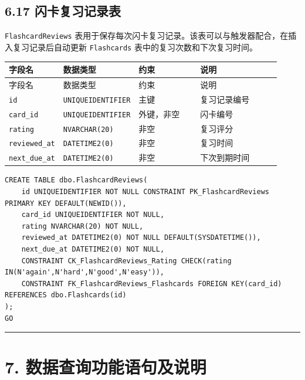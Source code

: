 \documentclass[10pt,a4paper,fontset=none]{ctexart}
\begin{document}
\subsection*{6.17 闪卡复习记录表}

\texttt{FlashcardReviews} 表用于保存每次闪卡复习记录。该表可以与触发器配合，在插入复习记录后自动更新 \texttt{Flashcards} 表中的复习次数和下次复习时间。\par

\begingroup\scriptsize
\renewcommand{\arraystretch}{1.18}
\setlength{\LTleft}{0pt}
\setlength{\LTright}{0pt}
\begin{longtable}{>{\raggedright\arraybackslash}p{0.20\linewidth}>{\raggedright\arraybackslash}p{0.16\linewidth}>{\raggedright\arraybackslash}p{0.24\linewidth}>{\raggedright\arraybackslash}p{0.32\linewidth}}
\toprule
字段名 & 数据类型 & 约束 & 说明 \\
\midrule
\endfirsthead
\toprule
字段名 & 数据类型 & 约束 & 说明 \\
\midrule
\endhead
\texttt{id} & \texttt{UNIQUEIDENTIFIER} & 主键 & 复习记录编号 \\
\texttt{card\_id} & \texttt{UNIQUEIDENTIFIER} & 外键，非空 & 闪卡编号 \\
\texttt{rating} & \texttt{NVARCHAR(20)} & 非空 & 复习评分 \\
\texttt{reviewed\_at} & \texttt{DATETIME2(0)} & 非空 & 复习时间 \\
\texttt{next\_due\_at} & \texttt{DATETIME2(0)} & 非空 & 下次到期时间 \\
\bottomrule
\end{longtable}
\endgroup


\begin{Verbatim}[fontsize=\scriptsize,frame=single]
CREATE TABLE dbo.FlashcardReviews(
    id UNIQUEIDENTIFIER NOT NULL CONSTRAINT PK_FlashcardReviews PRIMARY KEY DEFAULT(NEWID()),
    card_id UNIQUEIDENTIFIER NOT NULL,
    rating NVARCHAR(20) NOT NULL,
    reviewed_at DATETIME2(0) NOT NULL DEFAULT(SYSDATETIME()),
    next_due_at DATETIME2(0) NOT NULL,
    CONSTRAINT CK_FlashcardReviews_Rating CHECK(rating IN(N'again',N'hard',N'good',N'easy')),
    CONSTRAINT FK_FlashcardReviews_Flashcards FOREIGN KEY(card_id) REFERENCES dbo.Flashcards(id)
);
GO
\end{Verbatim}

\bigskip\hrule\bigskip
\clearpage
\section*{7. 数据查询功能语句及说明}
\end{document}
